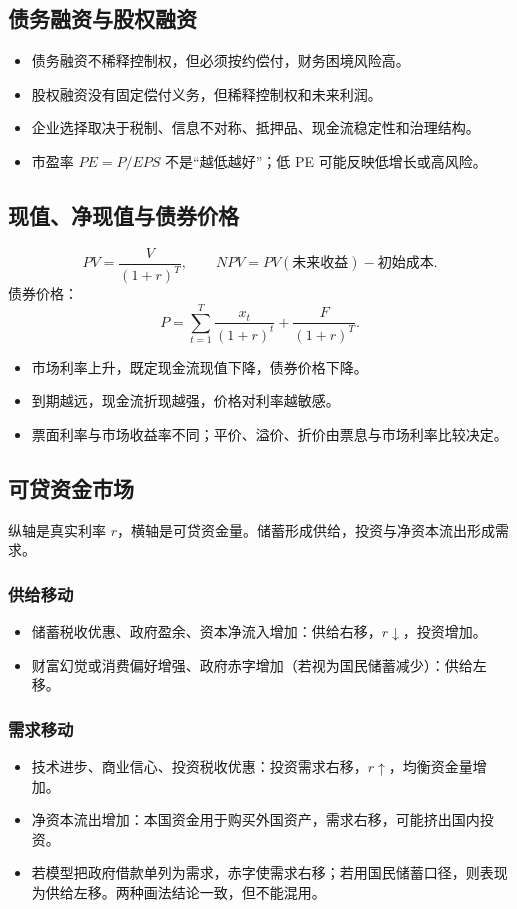 \documentclass[UTF8,11pt,a4paper]{ctexart}
\begin{document}
\subsection{债务融资与股权融资}
\begin{itemize}
  \item 债务融资不稀释控制权，但必须按约偿付，财务困境风险高。
  \item 股权融资没有固定偿付义务，但稀释控制权和未来利润。
  \item 企业选择取决于税制、信息不对称、抵押品、现金流稳定性和治理结构。
  \item 市盈率 $PE=P/EPS$ 不是“越低越好”；低 PE 可能反映低增长或高风险。
\end{itemize}

\subsection{现值、净现值与债券价格}
\[
PV=\frac{V}{(1+r)^T},
\qquad
NPV=PV(\text{未来收益})-\text{初始成本}.
\]
债券价格：
\[
P=\sum_{t=1}^{T}\frac{x_t}{(1+r)^t}+\frac{F}{(1+r)^T}.
\]
\begin{itemize}
  \item 市场利率上升，既定现金流现值下降，债券价格下降。
  \item 到期越远，现金流折现越强，价格对利率越敏感。
  \item 票面利率与市场收益率不同；平价、溢价、折价由票息与市场利率比较决定。
\end{itemize}

\subsection{可贷资金市场}
纵轴是真实利率 $r$，横轴是可贷资金量。储蓄形成供给，投资与净资本流出形成需求。

\subsubsection{供给移动}
\begin{itemize}
  \item 储蓄税收优惠、政府盈余、资本净流入增加：供给右移，$r\downarrow$，投资增加。
  \item 财富幻觉或消费偏好增强、政府赤字增加（若视为国民储蓄减少）：供给左移。
\end{itemize}

\subsubsection{需求移动}
\begin{itemize}
  \item 技术进步、商业信心、投资税收优惠：投资需求右移，$r\uparrow$，均衡资金量增加。
  \item 净资本流出增加：本国资金用于购买外国资产，需求右移，可能挤出国内投资。
  \item 若模型把政府借款单列为需求，赤字使需求右移；若用国民储蓄口径，则表现为供给左移。两种画法结论一致，但不能混用。
\end{itemize}
\end{document}

